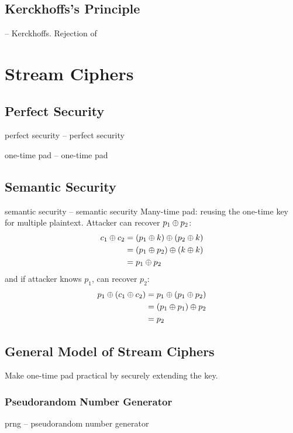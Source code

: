 \documentclass[final]{article}
\begin{document}
\subsection{Kerckhoffs’s Principle}
 -- \glsdesc*{Kerckhoffs}. Rejection of 
\section{Stream Ciphers}
\subsection{Perfect Security}
\Gls{perfect security} -- \glsdesc*{perfect security}

\Gls{one-time pad} -- \glsdesc*{one-time pad}
\subsection{Semantic Security}
\Gls{semantic security} -- \glsdesc*{semantic security}
Many-time pad: reusing the one-time key for multiple plaintext. Attacker can recover $p_1 \oplus p_2$:
\begin{align*}c_1 \oplus c_2
     & = (p_1 \oplus k) \oplus (p_2 \oplus k) \\
     & = (p_1 \oplus p_2) \oplus (k \oplus k) \\
     & = p_1 \oplus p_2
\end{align*}
and if attacker knows $p_1$, can recover $p_2$:
\begin{align*}p_1 \oplus (c_1 \oplus c_2)
     & = p_1 \oplus (p_1 \oplus p_2) \\
     & = (p_1 \oplus p_1) \oplus p_2 \\
     & = p_2
\end{align*}
\subsection{General Model of Stream Ciphers}
Make one-time pad practical by securely extending the key.
\subsubsection*{Pseudorandom Number Generator}
\acrfull{prng} -- \glsdesc*{pseudorandom number generator}
\end{document}
